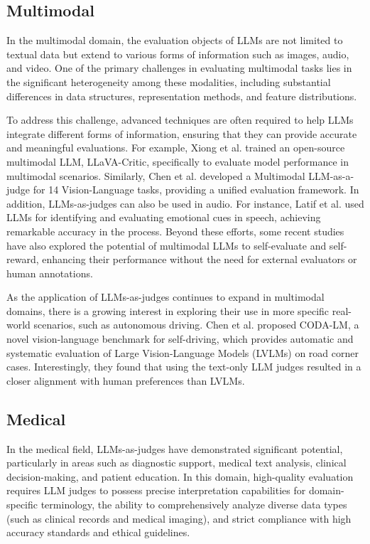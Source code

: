 \subsection{Multimodal}
\label{sec:Multimodal}
In the multimodal domain, the evaluation objects of LLMs are not limited to textual data but extend to various forms of information such as images, audio, and video. One of the primary challenges in evaluating multimodal tasks lies in the significant heterogeneity among these modalities, including substantial differences in data structures, representation methods, and feature distributions.

To address this challenge, advanced techniques are often required to help LLMs integrate different forms of information, ensuring that they can provide accurate and meaningful evaluations. For example, Xiong et al. \cite{xiong2024llava} trained an open-source multimodal LLM, LLaVA-Critic, specifically to evaluate model performance in multimodal scenarios. Similarly, Chen et al. \cite{chen2024mllm} developed a Multimodal LLM-as-a-judge for 14 Vision-Language tasks, providing a unified evaluation framework. In addition, LLMs-as-judges can also be used in audio. For instance, Latif et al. \cite{latif2023can} used LLMs for identifying and evaluating emotional cues in speech, achieving remarkable accuracy in the process. Beyond these efforts, some recent studies \cite{zhou2024calibrated, deng2024efficient} have also explored the potential of multimodal LLMs to self-evaluate and self-reward, enhancing their performance without the need for external evaluators or human annotations.

As the application of LLMs-as-judges continues to expand in multimodal domains, there is a growing interest in exploring their use in more specific real-world scenarios, such as autonomous driving. Chen et al. \cite{chen2024automated} proposed CODA-LM, a novel vision-language benchmark for self-driving, which provides automatic and systematic evaluation of Large Vision-Language Models (LVLMs) on road corner cases. Interestingly, they found that using the text-only LLM judges resulted in a closer alignment with human preferences than LVLMs. 



\subsection{Medical}
\label{sec:Medical}
In the medical field, LLMs-as-judges have demonstrated significant potential, particularly in areas such as diagnostic support, medical text analysis, clinical decision-making, and patient education.
In this domain, high-quality evaluation requires LLM judges to possess precise interpretation capabilities for domain-specific terminology, the ability to comprehensively analyze diverse data types (such as clinical records and medical imaging), and strict compliance with high accuracy standards and ethical guidelines.




